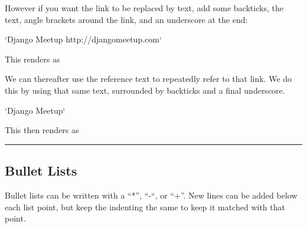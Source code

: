 \documentclass[letterpaper,10pt,english]{sphinxmanual}
\begin{document}
\begin{sphinxVerbatim}[commandchars=\\\{\}]
\end{sphinxVerbatim}

However if you want the link to be replaced by text, add some backticks, the text, angle brackets around the link, and an underscore at the end:

\begin{sphinxVerbatim}[commandchars=\\\{\}]
{}`Django Meetup \PYGZlt{}http://djangomeetup.com\PYGZgt{}{}`\PYGZus{}
\end{sphinxVerbatim}

This renders as

We can thereafter use the reference text to repeatedly refer to that link.
We do this by using that same text, surrounded by backticks and a final underscore.

\begin{sphinxVerbatim}[commandchars=\\\{\}]
{}`Django Meetup{}`\PYGZus{}
\end{sphinxVerbatim}

This then renders as


\bigskip\hrule\bigskip



\subsection{Bullet Lists}
\label{\detokenize{guide/99_rst-guide:bullet-lists}}
Bullet lists can be written with a “*”, “-“, or “+”.
New lines can be added below each list point, but keep the indenting the same to keep it matched with that point.
\end{document}
